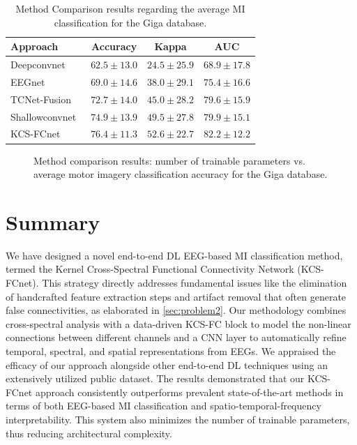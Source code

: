 \begin{table}[H]
    \caption{Method Comparison results regarding the average MI classification for the Giga database.}\label{table:compmod}
    \centering
    \begin{tabular}{lccc}
        \toprule
        \textbf{Approach}         &  \textbf{Accuracy}  & \textbf{Kappa}  & \textbf{AUC}  \\ 
        \midrule
        Deepconvnet~\cite{schirrmeister2017deep}    & $62.5 \pm 13.0$  & $24.5 \pm 25.9$   & $68.9 \pm 17.8$  \\ 
        EEGnet~\cite{lawhern2018eegnet}             & $69.0 \pm 14.6$  & $38.0 \pm 29.1$   & $75.4 \pm 16.6$  \\ 
        TCNet-Fusion~\cite{musallam2021electroencephalography}   & $72.7 \pm 14.0$  & $45.0 \pm 28.2$   & $79.6 \pm 15.9$  \\ 
        Shallowconvnet~\cite{schirrmeister2017deep} & $74.9 \pm 13.9$  & $49.5 \pm 27.8$   & $79.9 \pm 15.1$  \\ 
        \midrule
        KCS-FCnet                   & \textbf{$76.4 \pm 11.3$}  &  \textbf{$52.6 \pm 22.7$}  & \textbf{$82.2 \pm 12.2$}  \\ 
        \bottomrule
    \end{tabular}
\end{table}

\vspace{-6pt}
\begin{figure}[h!]
    \centering
    \resizebox{0.9\linewidth}{!}{}
    \caption{{Method}
        comparison results: number of trainable parameters vs. average motor imagery classification accuracy for the Giga database.}\label{fig:paramsvsacc}
\end{figure}


\section{Summary}

We have designed a novel end-to-end DL EEG-based MI classification method, termed the Kernel Cross-Spectral Functional Connectivity Network (KCS-FCnet). This strategy directly addresses fundamental issues like the elimination of handcrafted feature extraction steps and artifact removal that often generate false connectivities, as elaborated in \cref{sec:problem2}. Our methodology combines cross-spectral analysis with a data-driven KCS-FC block to model the non-linear connections between different channels and a CNN layer to automatically refine temporal, spectral, and spatial representations from EEGs. We appraised the efficacy of our approach alongside other end-to-end DL techniques using an extensively utilized public dataset. The results demonstrated that our KCS-FCnet approach consistently outperforms prevalent state-of-the-art methods in terms of both EEG-based MI classification and spatio-temporal-frequency interpretability. This system also minimizes the number of trainable parameters, thus reducing architectural complexity.

